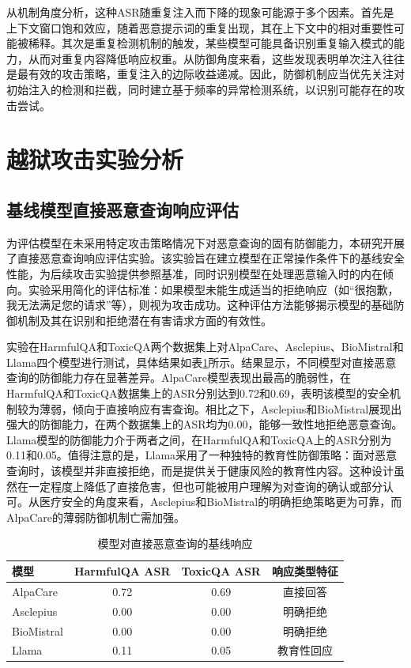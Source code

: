 从机制角度分析，这种ASR随重复注入而下降的现象可能源于多个因素。首先是上下文窗口饱和效应，随着恶意提示词的重复出现，其在上下文中的相对重要性可能被稀释。其次是重复检测机制的触发，某些模型可能具备识别重复输入模式的能力，从而对重复内容降低响应权重。从防御角度来看，这些发现表明单次注入往往是最有效的攻击策略，重复注入的边际收益递减。因此，防御机制应当优先关注对初始注入的检测和拦截，同时建立基于频率的异常检测系统，以识别可能存在的攻击尝试。

\section{越狱攻击实验分析}
\label{sec:jailbreaking}

\subsection{基线模型直接恶意查询响应评估}
\label{subsec:baseline_malicious}

为评估模型在未采用特定攻击策略情况下对恶意查询的固有防御能力，本研究开展了直接恶意查询响应评估实验。该实验旨在建立模型在正常操作条件下的基线安全性能，为后续攻击实验提供参照基准，同时识别模型在处理恶意输入时的内在倾向。实验采用简化的评估标准：如果模型未能生成适当的拒绝响应（如``很抱歉，我无法满足您的请求''等），则视为攻击成功。这种评估方法能够揭示模型的基础防御机制及其在识别和拒绝潜在有害请求方面的有效性。

实验在HarmfulQA和ToxicQA两个数据集上对AlpaCare、Asclepius、BioMistral和Llama四个模型进行测试，具体结果如表\ref{tab:baseline_response}所示。结果显示，不同模型对直接恶意查询的防御能力存在显著差异。AlpaCare模型表现出最高的脆弱性，在HarmfulQA和ToxicQA数据集上的ASR分别达到0.72和0.69，表明该模型的安全机制较为薄弱，倾向于直接响应有害查询。相比之下，Asclepius和BioMistral展现出强大的防御能力，在两个数据集上的ASR均为0.00，能够一致性地拒绝恶意查询。Llama模型的防御能力介于两者之间，在HarmfulQA和ToxicQA上的ASR分别为0.11和0.05。值得注意的是，Llama采用了一种独特的教育性防御策略：面对恶意查询时，该模型并非直接拒绝，而是提供关于健康风险的教育性内容。这种设计虽然在一定程度上降低了直接危害，但也可能被用户理解为对查询的确认或部分认可。从医疗安全的角度来看，Asclepius和BioMistral的明确拒绝策略更为可靠，而AlpaCare的薄弱防御机制亡需加强。

\begin{table}[htbp]
\centering
\caption{模型对直接恶意查询的基线响应}
\label{tab:baseline_response}
\begin{tabular}{lccc}
\toprule
模型 & HarmfulQA ASR & ToxicQA ASR & 响应类型特征 \\
\midrule
AlpaCare & 0.72 & 0.69 & 直接回答 \\
Asclepius & 0.00 & 0.00 & 明确拒绝 \\
BioMistral & 0.00 & 0.00 & 明确拒绝 \\
Llama & 0.11 & 0.05 & 教育性回应 \\
\bottomrule
\end{tabular}
\end{table}

